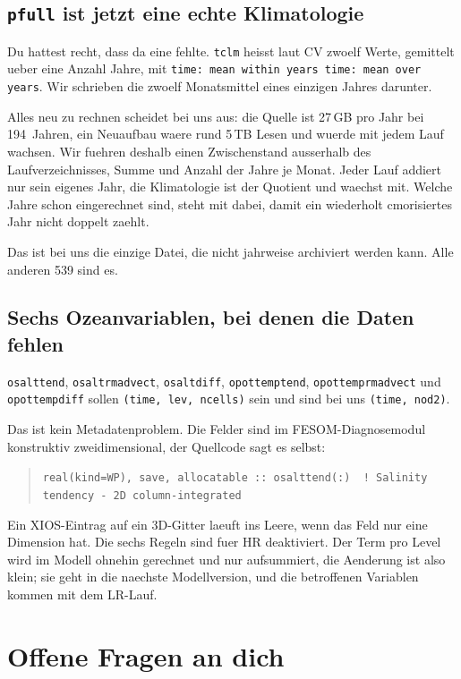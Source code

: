 \documentclass[11pt,a4paper]{article}
\newcommand{\code}[1]{\texttt{\small #1}}
\begin{document}
\subsection*{\code{pfull} ist jetzt eine echte Klimatologie}

Du hattest recht, dass da eine fehlte. \code{tclm} heisst laut CV zwoelf Werte,
gemittelt ueber eine Anzahl Jahre, mit \code{time: mean within years time: mean over
years}. Wir schrieben die zwoelf Monatsmittel eines einzigen Jahres darunter.

Alles neu zu rechnen scheidet bei uns aus: die Quelle ist 27\,GB pro Jahr bei
194~Jahren, ein Neuaufbau waere rund 5\,TB Lesen und wuerde mit jedem Lauf wachsen.
Wir fuehren deshalb einen Zwischenstand ausserhalb des Laufverzeichnisses, Summe und
Anzahl der Jahre je Monat. Jeder Lauf addiert nur sein eigenes Jahr, die Klimatologie
ist der Quotient und waechst mit. Welche Jahre schon eingerechnet sind, steht mit
dabei, damit ein wiederholt cmorisiertes Jahr nicht doppelt zaehlt.

Das ist bei uns die einzige Datei, die nicht jahrweise archiviert werden kann. Alle
anderen 539 sind es.

\subsection*{Sechs Ozeanvariablen, bei denen die Daten fehlen}

\code{osalttend}, \code{osaltrmadvect}, \code{osaltdiff}, \code{opottemptend},
\code{opottemprmadvect} und \code{opottempdiff} sollen \code{(time, lev, ncells)}
sein und sind bei uns \code{(time, nod2)}.

Das ist kein Metadatenproblem. Die Felder sind im FESOM-Diagnosemodul konstruktiv
zweidimensional, der Quellcode sagt es selbst:

\begin{quote}
\code{real(kind=WP), save, allocatable :: osalttend(:)\ \ ! Salinity tendency - 2D column-integrated}
\end{quote}

Ein XIOS-Eintrag auf ein 3D-Gitter laeuft ins Leere, wenn das Feld nur eine Dimension
hat. Die sechs Regeln sind fuer HR deaktiviert. Der Term pro Level wird im Modell
ohnehin gerechnet und nur aufsummiert, die Aenderung ist also klein; sie geht in die
naechste Modellversion, und die betroffenen Variablen kommen mit dem LR-Lauf.

\section{Offene Fragen an dich}
\end{document}
